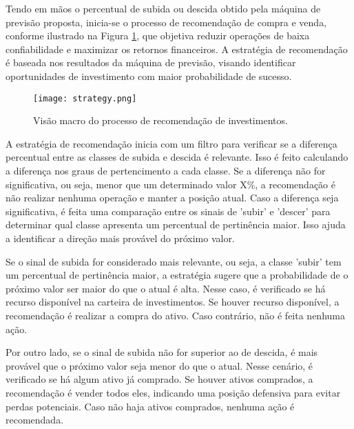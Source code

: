 Tendo em mãos o percentual de subida ou descida obtido pela máquina de previsão proposta, inicia-se o processo de recomendação de compra e venda, conforme ilustrado na Figura \ref{fig:strategy}, que objetiva reduzir operações de baixa confiabilidade e maximizar os retornos financeiros. A estratégia de recomendação é baseada nos resultados da máquina de previsão, visando identificar oportunidades de investimento com maior probabilidade de sucesso.

\begin{figure}[htbp]
    \caption{Visão macro do processo de recomendação de investimentos.}
      \centering
    \texttt{[image: strategy.png]} 
    \label{fig:strategy}
\end{figure}


A estratégia de recomendação inicia com um filtro para verificar se a diferença percentual entre as classes de subida e descida é relevante. Isso é feito calculando a diferença nos graus de pertencimento a cada classe. Se a diferença não for significativa, ou seja, menor que um determinado valor X\%, a recomendação é não realizar nenhuma operação e manter a posição atual.
Caso a diferença seja significativa, é feita uma comparação entre os sinais de 'subir' e 'descer' para determinar qual classe apresenta um percentual de pertinência maior. Isso ajuda a identificar a direção mais provável do próximo valor.

Se o sinal de subida for considerado mais relevante, ou seja, a classe 'subir' tem um percentual de pertinência maior, a estratégia sugere que a probabilidade de o próximo valor ser maior do que o atual é alta. Nesse caso, é verificado se há recurso disponível na carteira de investimentos. Se houver recurso disponível, a recomendação é realizar a compra do ativo. Caso contrário, não é feita nenhuma ação.

Por outro lado, se o sinal de subida não for superior ao de descida, é mais provável que o próximo valor seja menor do que o atual. Nesse cenário, é verificado se há algum ativo já comprado. Se houver ativos comprados, a recomendação é vender todos eles, indicando uma posição defensiva para evitar perdas potenciais. Caso não haja ativos comprados, nenhuma ação é recomendada.
